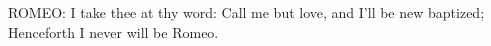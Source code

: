 ROMEO:
I take thee at thy word:
Call me but love, and I'll be new baptized;
Henceforth I never will be Romeo.